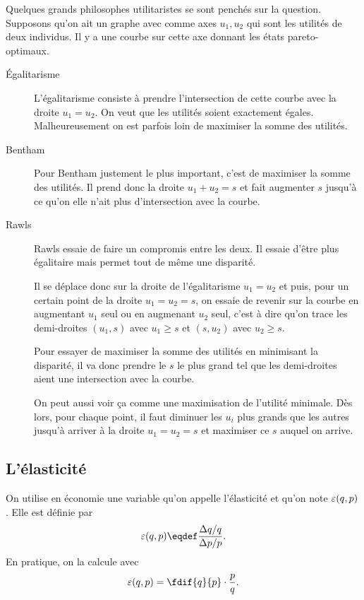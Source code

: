 Quelques grands philosophes utilitaristes se sont penchés sur la question.
Supposons qu'on ait un graphe avec comme axes $u_1,u_2$ qui sont les
utilités de deux individus.
Il y a une courbe sur cette axe donnant les états pareto-optimaux.
\begin{description}
  \item[Égalitarisme]
    L'égalitarisme consiste à prendre l'intersection de cette courbe
    avec la droite $u_1 = u_2$.
    On veut que les utilités soient exactement égales.
    Malheureusement on est parfois loin de maximiser la somme des
    utilités.
  \item[Bentham]
    Pour Bentham justement le plus important, c'est de maximiser la somme
    des utilités.
    Il prend donc la droite $u_1 + u_2 = s$ et fait augmenter $s$ jusqu'à
    ce qu'on elle n'ait plus d'intersection avec la courbe.
  \item[Rawls]
    Rawls essaie de faire un compromis entre les deux.
    Il essaie d'être plus égalitaire mais permet tout de même une disparité.

    Il se déplace donc sur la droite de l'égalitarisme $u_1 = u_2$
    et puis, pour un certain point de la droite $u_1 = u_2 = s$,
    on essaie de revenir sur la courbe en augmentant $u_1$ seul ou en
    augmenant $u_2$ seul, c'est à dire qu'on trace les demi-droites
    $(u_1,s)$ avec $u_1 \geq s$ et $(s,u_2)$ avec $u_2 \geq s$.

    Pour essayer de maximiser la somme des utilités en minimisant la
    disparité, il va donc prendre le $s$ le plus grand tel que les demi-droites
    aient une intersection avec la courbe.

    On peut aussi voir ça comme une maximisation de l'utilité minimale.
    Dès lors, pour chaque point, il faut diminuer les $u_i$ plus grands
    que les autres jusqu'à arriver à la droite $u_1 = u_2 = s$ et maximiser
    ce $s$ auquel on arrive.
\end{description}

\subsection{L'élasticité}
On utilise en économie une variable qu'on appelle l'élasticité et qu'on note
$\varepsilon(q,p)$. Elle est définie par
\begin{equation}
  \label{eq:elasticity}
  \elasticity(q,p) \eqdef \frac{\Delta q/q}{\Delta p/p}.
\end{equation}
En pratique, on la calcule avec
\[ \elasticity(q,p) = \fdif{q}{p}\cdot \frac{p}{q}. \]

